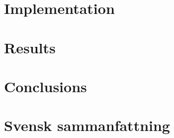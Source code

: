 \documentclass[a4paper,12pt]{article}
\begin{document}
\section{Implementation}

\newpage
\section{Results}

\newpage

\section{Conclusions}

\newpage

\section*{Svensk sammanfattning}




\end{document}
